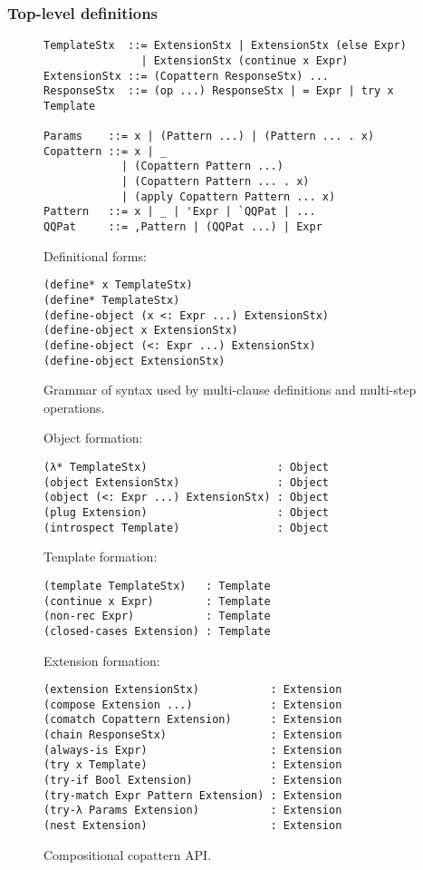 \subsubsection{Top-level definitions}

\begin{figure}[t]
\centering

\begin{verbatim}
TemplateStx  ::= ExtensionStx | ExtensionStx (else Expr)
               | ExtensionStx (continue x Expr)
ExtensionStx ::= (Copattern ResponseStx) ...
ResponseStx  ::= (op ...) ResponseStx | = Expr | try x Template

Params    ::= x | (Pattern ...) | (Pattern ... . x)
Copattern ::= x | _
            | (Copattern Pattern ...)
            | (Copattern Pattern ... . x)
            | (apply Copattern Pattern ... x)
Pattern   ::= x | _ | 'Expr | `QQPat | ...
QQPat     ::= ,Pattern | (QQPat ...) | Expr
\end{verbatim}

Definitional forms:
\begin{verbatim}
(define* x TemplateStx)
(define* TemplateStx)
(define-object (x <: Expr ...) ExtensionStx)
(define-object x ExtensionStx)
(define-object (<: Expr ...) ExtensionStx)
(define-object ExtensionStx)
\end{verbatim}

\caption{Grammar of syntax used by multi-clause definitions and multi-step operations.}
\label{fig:macro-syntax}
\end{figure}

\begin{figure}[t]
\centering

Object formation:
\begin{verbatim}
(λ* TemplateStx)                    : Object
(object ExtensionStx)               : Object
(object (<: Expr ...) ExtensionStx) : Object
(plug Extension)                    : Object
(introspect Template)               : Object
\end{verbatim}

Template formation:
\begin{verbatim}
(template TemplateStx)   : Template
(continue x Expr)        : Template
(non-rec Expr)           : Template
(closed-cases Extension) : Template
\end{verbatim}

Extension formation:
\begin{verbatim}
(extension ExtensionStx)           : Extension
(compose Extension ...)            : Extension
(comatch Copattern Extension)      : Extension
(chain ResponseStx)                : Extension
(always-is Expr)                   : Extension
(try x Template)                   : Extension
(try-if Bool Extension)            : Extension
(try-match Expr Pattern Extension) : Extension
(try-λ Params Extension)           : Extension
(nest Extension)                   : Extension
\end{verbatim}
\caption{Compositional copattern API.}
\label{fig:api}
\end{figure}

